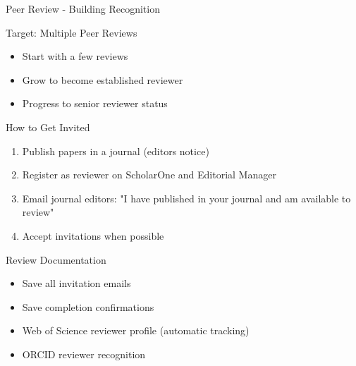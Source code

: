 \documentclass[11pt]{beamer}
\begin{document}
	\begin{frame}{Peer Review - Building Recognition}
		\scriptsize
		\begin{block}{Target: Multiple Peer Reviews}
			\begin{itemize}
				\item Start with a few reviews
				\item Grow to become established reviewer
				\item Progress to senior reviewer status
			\end{itemize}
		\end{block}
		\begin{block}{How to Get Invited}
			\begin{enumerate}
				\item Publish papers in a journal (editors notice)
				\item Register as reviewer on ScholarOne and Editorial Manager
				\item Email journal editors: "I have published in your journal and am available to review"
				\item Accept invitations when possible
			\end{enumerate}
		\end{block}
		\begin{block}{Review Documentation}
			\begin{itemize}
				\item Save all invitation emails
				\item Save completion confirmations
				\item Web of Science reviewer profile (automatic tracking)
				\item ORCID reviewer recognition
			\end{itemize}
		\end{block}
	\end{frame}
	
\end{document}
